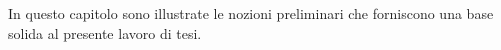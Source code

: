 
In questo capitolo sono illustrate le nozioni preliminari che forniscono una base solida al presente lavoro di tesi.







